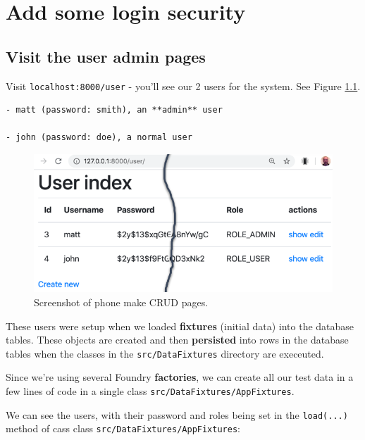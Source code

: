 \documentclass[a4paperpaper,openright]{book}
\begin{document}
\hypertarget{add-some-login-security}{%
\chapter{Add some login security}\label{add-some-login-security}}

\hypertarget{visit-the-user-admin-pages}{%
\section{Visit the user admin pages}\label{visit-the-user-admin-pages}}

Visit \texttt{localhost:8000/user} - you'll see our 2 users for the
system. See Figure \ref{user_index}.

\begin{verbatim}
- matt (password: smith), an **admin** user

- john (password: doe), a normal user
\end{verbatim}

\begin{figure}
\centering
\includegraphics[width=1\textwidth,height=\textheight]{./tex2pdf.-2b0e1314f8bbbae5/802ac6fcfe8735aad07e9f15b9bdd179a6b64592.png}
\caption{Screenshot of phone make CRUD pages.\label{user_index}}
\end{figure}

These users were setup when we loaded \textbf{fixtures} (initial data)
into the database tables. These objects are created and then
\textbf{persisted} into rows in the database tables when the classes in
the \texttt{src/DataFixtures} directory are execeuted.

Since we're using several Foundry \textbf{factories}, we can create all
our test data in a few lines of code in a single class
\texttt{src/DataFixtures/AppFixtures}.

We can see the users, with their password and roles being set in the
\texttt{load(...)} method of cass class
\texttt{src/DataFixtures/AppFixtures}:
\end{document}
